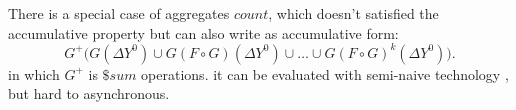 {{		
		There is a special case of aggregates $count$, which doesn't satisfied the accumulative property but can also write as accumulative form:
		\begin{equation}
		\label{eq:accumasyncres}
		G^+\Big(G(\Delta Y^0)\cup G(F\circ G)(\Delta Y^0)\cup\ldots\cup G(F\circ G)^k(\Delta Y^0)\Big).
		\end{equation}
		in which $G^+$ is $\$sum$ operations. it can be evaluated with semi-naive technology , but hard to asynchronous.
	}
	
	}
